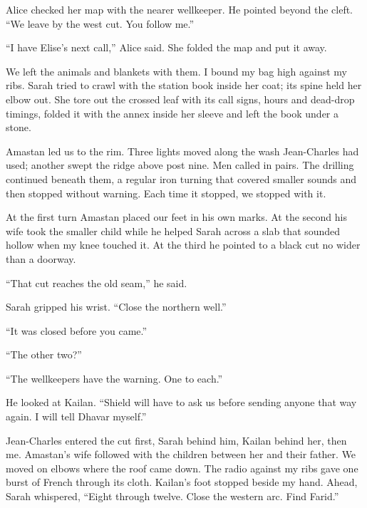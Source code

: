 Alice checked her map with the nearer wellkeeper. He pointed beyond the cleft. ``We leave by the west cut. You follow me.''\par

``I have Elise's next call,'' Alice said. She folded the map and put it away.\par

We left the animals and blankets with them. I bound my bag high against my ribs. Sarah tried to crawl with the station book inside her coat; its spine held her elbow out. She tore out the crossed leaf with its call signs, hours and dead-drop timings, folded it with the annex inside her sleeve and left the book under a stone.\par

Amastan led us to the rim. Three lights moved along the wash Jean-Charles had used; another swept the ridge above post nine. Men called in pairs. The drilling continued beneath them, a regular iron turning that covered smaller sounds and then stopped without warning. Each time it stopped, we stopped with it.\par

At the first turn Amastan placed our feet in his own marks. At the second his wife took the smaller child while he helped Sarah across a slab that sounded hollow when my knee touched it. At the third he pointed to a black cut no wider than a doorway.\par

``That cut reaches the old seam,'' he said.\par

Sarah gripped his wrist. ``Close the northern well.''\par

``It was closed before you came.''\par

``The other two?''\par

``The wellkeepers have the warning. One to each.''\par

He looked at Kailan. ``Shield will have to ask us before sending anyone that way again. I will tell Dhavar myself.''\par

Jean-Charles entered the cut first, Sarah behind him, Kailan behind her, then me. Amastan's wife followed with the children between her and their father. We moved on elbows where the roof came down. The radio against my ribs gave one burst of French through its cloth. Kailan's foot stopped beside my hand. Ahead, Sarah whispered, ``Eight through twelve. Close the western arc. Find Farid.''\par

